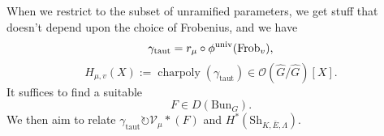\documentclass[reqno]{amsart} 
\begin{document}
When we restrict to the subset of unramified parameters, we get stuff that doesn't depend upon the choice of Frobenius, and we have
\begin{equation*}
  \gamma_{\mathrm{taut}} = r_\mu \circ \phi^{\mathrm{univ}}(\operatorname{Frob}_v),
\end{equation*}
\begin{equation*}
  H_{\mu, v}(X) := \operatorname{charpoly} \left( \gamma_{\mathrm{taut}} \right) \in \mathcal{O} \left( \hat{G} / \hat{G} \right)[X].
\end{equation*}
It suffices to find a suitable
\begin{equation*}
  F \in D(\mathrm{Bun}_G).
\end{equation*}
We then aim to relate $\gamma_{\mathrm{taut}} \circlearrowright \mathcal{V}_\mu \ast(F)$ and $H^\ast(\mathrm{Sh}_{K, \bar{E}, \Lambda})$.
\end{document}

